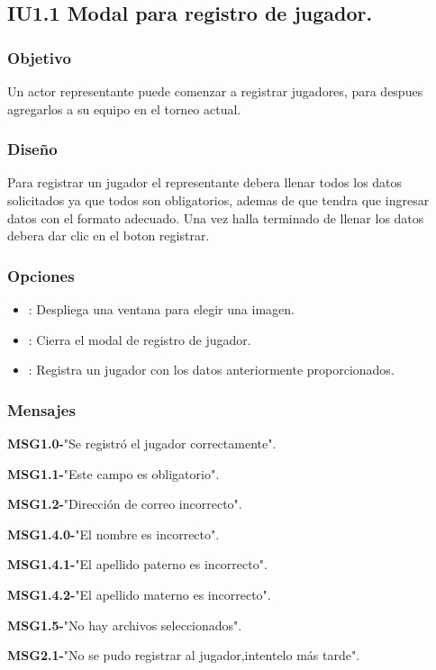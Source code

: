 
\subsection{IU1.1 Modal para registro de jugador.}

\subsubsection{Objetivo}
	Un actor representante puede comenzar a registrar jugadores, para despues agregarlos a su equipo en el torneo actual.

\subsubsection{Diseño}
  Para registrar un jugador el representante debera llenar todos los datos solicitados ya que todos son obligatorios, ademas de que tendra que ingresar datos con el formato adecuado.
  Una vez halla terminado de llenar los datos debera dar clic en el boton registrar.

\subsubsection{Opciones}
\begin{itemize}
  \item {}: Despliega una ventana para elegir una imagen.
  \item {}: Cierra el modal de registro de jugador.
  \item {}: Registra un jugador con los datos anteriormente proporcionados.
  
\end{itemize}

\subsubsection{Mensajes}
	\begin{Citemize}
		\item {\bf MSG1.0-}"Se registró el jugador correctamente".
		\item {\bf MSG1.1-}"Este campo es obligatorio".
		\item {\bf MSG1.2-}"Dirección de correo incorrecto".
		\item {\bf MSG1.4.0-}"El nombre es incorrecto".
		\item {\bf MSG1.4.1-}"El apellido paterno es incorrecto".
		\item {\bf MSG1.4.2-}"El apellido materno es incorrecto".
		\item {\bf MSG1.5-}"No hay archivos seleccionados".
		\item {\bf MSG2.1-}"No se pudo registrar al jugador,intentelo más tarde".
	\end{Citemize}
